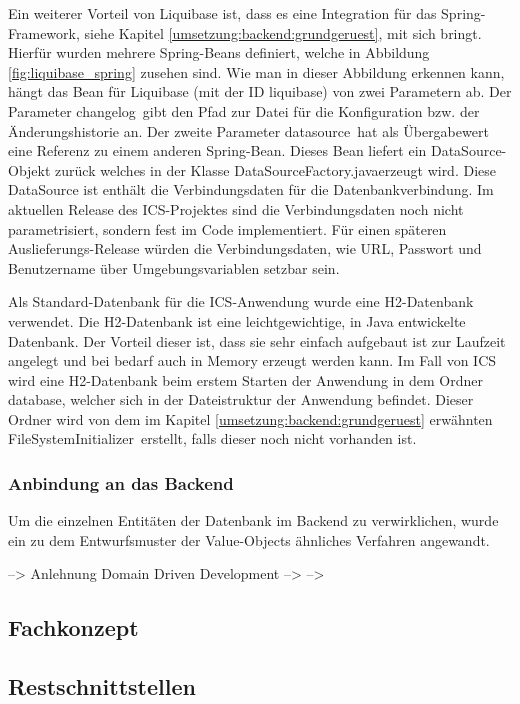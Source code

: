 Ein weiterer Vorteil von Liquibase ist, dass es eine Integration für das Spring-Framework, siehe Kapitel \ref{umsetzung:backend:grundgeruest}, mit sich bringt. Hierfür wurden mehrere Spring-Beans definiert, welche in Abbildung \ref{fig:liquibase_spring} zusehen sind. Wie man in dieser Abbildung erkennen kann, hängt das Bean für Liquibase (mit der \ac{ID} \glqq liquibase\grqq) von zwei Parametern ab. Der Parameter \glqq changelog\grqq \, gibt den Pfad zur Datei für die Konfiguration bzw. der Änderungshistorie an. Der zweite Parameter \glqq datasource\grqq \, hat als Übergabewert eine Referenz zu einem anderen Spring-Bean. Dieses Bean liefert ein \glqq DataSource\grqq-Objekt zurück welches in der Klasse \glqq DataSourceFactory.java\grqq erzeugt wird. Diese DataSource ist enthält die Verbindungsdaten für die Datenbankverbindung. Im aktuellen Release des \ac{ICS}-Projektes sind die Verbindungsdaten noch nicht parametrisiert, sondern fest im Code implementiert. Für einen späteren Auslieferungs-Release würden die Verbindungsdaten, wie URL, Passwort und Benutzername über Umgebungsvariablen setzbar sein.

Als Standard-Datenbank für die \ac{ICS}-Anwendung wurde eine H2-Datenbank verwendet. Die H2-Datenbank ist eine leichtgewichtige, in Java entwickelte Datenbank.\autocite{H2} Der Vorteil dieser ist, dass sie sehr einfach aufgebaut ist zur Laufzeit angelegt und bei bedarf auch in Memory erzeugt werden kann. Im Fall von \ac{ICS} wird eine H2-Datenbank beim erstem Starten der Anwendung in dem Ordner \glqq database\grqq, welcher sich in der Dateistruktur der Anwendung befindet. Dieser Ordner wird von dem im Kapitel \ref{umsetzung:backend:grundgeruest} erwähnten \glqq FileSystemInitializer\grqq \, erstellt, falls dieser noch nicht vorhanden ist.

\subsubsection{Anbindung an das Backend}

Um die einzelnen Entitäten der Datenbank im Backend zu verwirklichen, wurde ein zu dem Entwurfsmuster der Value-Objects ähnliches Verfahren angewandt. 

--> Anlehnung Domain Driven Development
--> 
--> 


\subsection{Fachkonzept}

\subsection{Restschnittstellen}

